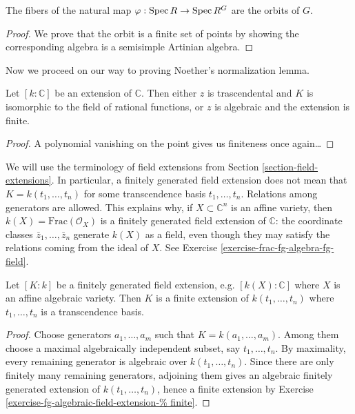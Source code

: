 \begin{theorem}
\label{theorem-orbit-space}
The fibers of the natural map
$\varphi:\mathop{\mathrm{Spec}} R \to \mathop{\mathrm{Spec}} R^G$
are the orbits of $G$.
\end{theorem}

\begin{proof}
We prove that the orbit is a finite
set of points by showing the corresponding
algebra is a semisimple Artinian algebra.
\end{proof}

\medskip\noindent
Now we proceed
on our way to proving Noether's
normalization lemma.

\begin{lemma}
\label{lemma-field-extension-finite}
Let $[k:\mathbb{C}]$ be an extension of
$\mathbb{C}$. Then either $z$ is
trascendental and $K$ is isomorphic to
the field of rational functions,
or $z$ is algebraic and the extension
is finite.
\end{lemma}

\begin{proof}
A polynomial vanishing on the point
gives us finiteness once again…
\end{proof}

\noindent
We will use the terminology of field
extensions from Section
\ref{section-field-extensions}.
In particular,
a finitely generated field extension does not
mean that $K=k(t_1,\ldots,t_n)$ for some
transcendence basis $t_1,\ldots,t_n$.
Relations among generators are allowed. This
explains why, if
$X \subset \mathbb{C}^n$ is an affine
variety,
then $k(X)=\text{Frac}(\mathcal{O}_X)$ is a
finitely generated field extension of
$\mathbb{C}$: the coordinate classes
$\bar z_1,\ldots,\bar z_n$ generate $k(X)$ as
a field, even though they may satisfy the
relations coming from the ideal of $X$.
See Exercise
\ref{exercise-frac-fg-algebra-fg-field}.

\begin{theorem}
\label{theorem-finitely-gen-extension}
Let $[K:k]$ be a finitely generated field
extension, e.g. $[k(X):\mathbb{C}]$
where $X$ is an affine algebraic variety.
Then $K$ is a finite extension
of $k(t_1,…,t_n)$ where $t_1,…,t_n$
is a transcendence basis.
\end{theorem}

\begin{proof}
Choose generators $a_1,\ldots,a_m$ such that
$K=k(a_1,\ldots,a_m)$.
Among them choose a maximal algebraically
independent subset, say $t_1,\ldots,t_n$.
By maximality, every remaining generator is
algebraic over $k(t_1,\ldots,t_n)$.
Since there are only finitely many remaining
generators, adjoining them gives an algebraic
finitely generated extension of
$k(t_1,\ldots,t_n)$, hence a finite extension
by Exercise
\ref{exercise-fg-algebraic-field-extension-%
finite}.
\end{proof}

